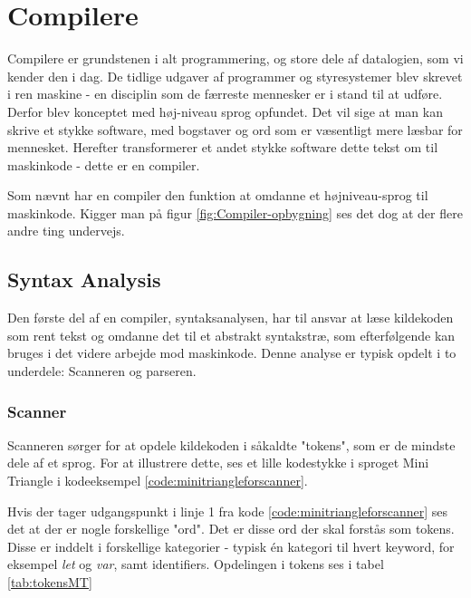 \section{Compilere}
Compilere er grundstenen i alt programmering, og store dele af datalogien, som vi kender den i dag. De tidlige udgaver af programmer og styresystemer blev skrevet i ren maskine - en disciplin som de færreste mennesker er i stand til at udføre. Derfor blev konceptet med høj-niveau sprog opfundet. Det vil sige at man kan skrive et stykke software, med bogstaver og ord som er væsentligt mere læsbar for mennesket. Herefter transformerer et andet stykke software dette tekst om til maskinkode - dette er en compiler.


\noindent Som nævnt har en compiler den funktion at omdanne et højniveau-sprog til maskinkode. Kigger man på figur \ref{fig:Compiler-opbygning} ses det dog at der flere andre ting undervejs.

\subsection{Syntax Analysis}
Den første del af en compiler, syntaksanalysen, har til ansvar at læse kildekoden som rent tekst og omdanne det til et abstrakt syntakstræ, som efterfølgende kan bruges i det videre arbejde mod maskinkode. Denne analyse er typisk opdelt i to underdele: Scanneren og parseren. 

\subsubsection{Scanner}
Scanneren sørger for at opdele kildekoden i såkaldte "tokens"\mbox{}, som er de mindste dele af et sprog. For at illustrere dette, ses et lille kodestykke i sproget Mini Triangle i kodeeksempel \ref{code:minitriangleforscanner}.


\noindent Hvis der tager udgangspunkt i linje 1 fra kode \ref{code:minitriangleforscanner} ses det at der er nogle forskellige "ord"\mbox{}. Det er disse ord der skal forstås som tokens. Disse er inddelt i forskellige kategorier - typisk én kategori til hvert keyword, for eksempel \textit{let} og \textit{var}, samt identifiers. Opdelingen i tokens ses i tabel \ref{tab:tokensMT}

